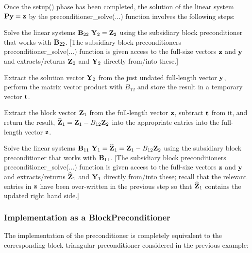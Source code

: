 Once the {\ttfamily setup()} phase has been completed, the solution of the linear system ${\bf P} {\bf y} = {\bf z}$ by the {\ttfamily preconditioner\+\_\+solve}(...) function involves the following steps\+:
\begin{DoxyItemize}
\item Solve the linear systems $ {\bf B}_{22} \ {\bf Y}_2 = {\bf Z}_2$ using the subsidiary block preconditioner that works with $ {\bf B}_{22} $. \mbox{[}The subsidiary block preconditioner\textquotesingle{}s {\ttfamily preconditioner\+\_\+solve}(...) function is given access to the full-\/size vectors $ {\bf z} $ and $ {\bf y} $ and extracts/returns $ {\bf Z}_2 $ and $ {\bf Y}_2$ directly from/into these.\mbox{]}
\item Extract the solution vector $ {\bf Y}_2 $ from the just undated full-\/length vector $ {\bf y} $, perform the matrix vector product with $ B_{12} $ and store the result in a temporary vector $ {\bf t} $.
\item Extract the block vector $ {\bf Z}_1$ from the full-\/length vector $ {\bf z} $, subtract $ {\bf t} $ from it, and return the result, $ \widehat{\bf Z}_1 = {\bf Z}_1 - B_{12} {\bf Z}_2 $ into the appropriate entries into the full-\/length vector $ {\bf z} $.
\item Solve the linear systems $ {\bf B}_{11} \ {\bf Y}_1 = \widehat{\bf Z}_1 = {\bf Z}_1 - B_{12} {\bf Z}_2 $ using the subsidiary block preconditioner that works with $ {\bf B}_{11} $. \mbox{[}The subsidiary block preconditioner\textquotesingle{}s {\ttfamily preconditioner\+\_\+solve}(...) function is given access to the full-\/size vectors $ {\bf z} $ and $ {\bf y} $ and extracts/returns $ \widehat{\bf Z}_1 $ and $ {\bf Y}_1$ directly from/into these; recall that the relevant entries in $ {\bf z}$ have been over-\/written in the previous step so that $ \widehat{\bf Z}_1 $ contains the updated right hand side.\mbox{]}
\end{DoxyItemize}\hypertarget{index_two_plus_three_upper_triangular_with_sub_implementation}{}\subsubsection{Implementation as a Block\+Preconditioner}\label{index_two_plus_three_upper_triangular_with_sub_implementation}
The implementation of the preconditioner is completely equivalent to the corresponding block triangular preconditioner considered in the previous example\+:


